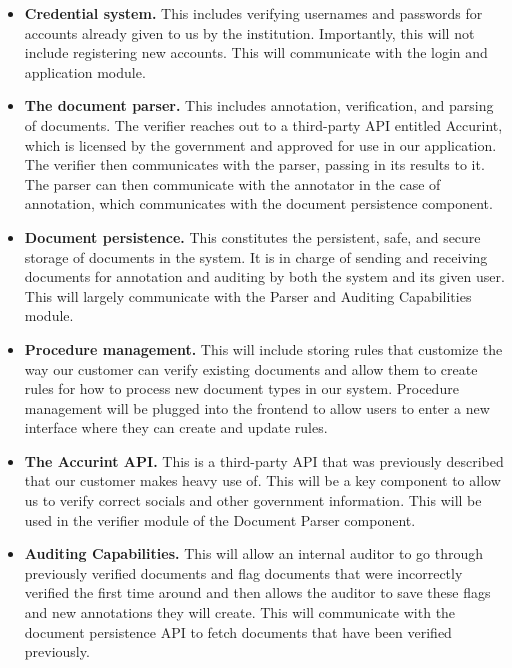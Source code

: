 \begin{itemize}[wide, labelindent=0pt]
    \item \textbf{Credential system.} This includes verifying usernames and passwords for accounts already given to us by the institution. Importantly, this will not include registering new accounts. This will communicate with the login and application module.
    \item \textbf{The document parser.} This includes annotation, verification, and parsing of documents. The verifier reaches out to a third-party API entitled Accurint, which is licensed by the government and approved for use in our application. The verifier then communicates with the parser, passing in its results to it. The parser can then communicate with the annotator in the case of annotation, which communicates with the document persistence component.
    \item \textbf{Document persistence.} This constitutes the persistent, safe, and secure storage of documents in the system. It is in charge of sending and receiving documents for annotation and auditing by both the system and its given user. This will largely communicate with the Parser and Auditing Capabilities module.
    \item \textbf{Procedure management.} This will include storing rules that customize the way our customer can verify existing documents and allow them to create rules for how to process new document types in our system. Procedure management will be plugged into the frontend to allow users to enter a new interface where they can create and update rules.
    \item \textbf{The Accurint API.} This is a third-party API that was previously described that our customer makes heavy use of. This will be a key component to allow us to verify correct socials and other government information. This will be used in the verifier module of the Document Parser component.
    \item \textbf{Auditing Capabilities.} This will allow an internal auditor to go through previously verified documents and flag documents that were incorrectly verified the first time around and then allows the auditor to save these flags and new annotations they will create. This will communicate with the document persistence API to fetch documents that have been verified previously.
\end{itemize}